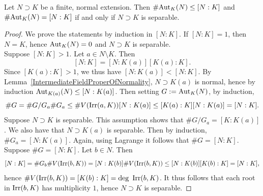 \begin{theorem}\label{SizeOfAutomorphismGroupsOfNormalFiniteExtensionsIsBoundedByDegreeWithEqualityOnlyIfSeparable} 
    Let $N\supset K$ be a finite, normal extension. Then $\#\mathrm{Aut}_K(N)\leq [N : K]$ and $\#\mathrm{Aut}_K(N) = [N : K]$ if and only if $N\supset K$ is separable. 
\end{theorem}
\begin{proof}
    We prove the statements by induction in $[N : K]$. If $[N : K] =1$, then $N=K$, hence $\mathrm{Aut}_K(N)=0$ and $N\supset K$ is separable.\\
    Suppose $[N : K] >1$. Let $a\in N\setminus K$. Then 
    $$
        [N : K]  = [N : K(a)][K(a) : K].
    $$  
    Since $[K(a) : K] >1$, we thus have $[N : K(a)] < [N : K]$. By Lemma~\ref{IntermediateFieldProperOfNormality}, $N \supset K(a)$ is normal, hence by induction $\mathrm{Aut}_{K(a)}(N) \leq [N : K(a)]$. Then setting $G := \mathrm{Aut}_K(N)$, by induction,
    $$
        \#G = \#G/G_a \#G_a \leq \#V(\mathrm{Irr}(a,K))[N : K(a)]\leq [K(a) : K][N : K(a)] = [N : K].
    $$
    Suppose $N\supset K$ is separable. This assumption shows that $\#G/G_a = [K : K(a)]$. We also have that $N\supset K(a)$ is separable. Then by induction, $\#G_a = [N : K(a)]$. Again, using Lagrange it follows that $\#G = [N : K]$.\\
    Suppose $\#G  =[N : K]$. Let $b \in N$. Then 
    $$
        [N : K] = \#G_b\#V(\mathrm{Irr}(b,K)) = [N : K(b)]\#V(\mathrm{Irr}(b,K)) \leq [N:K(b)][K(b) : K] = [N : K],
    $$ 
    hence $\#V(\Irr(b,K)) = [K(b) : K]=\deg \ \Irr(b,K)$. It thus follows that each root in $\mathrm{Irr}(b,K)$ has multiplicity $1$, hence $N\supset K$ is separable. 
\end{proof}

